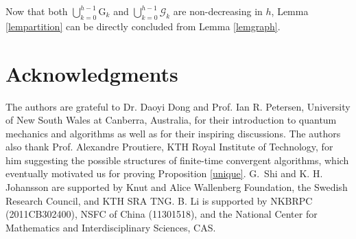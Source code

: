 \documentclass[a4paper, 11pt]{article}
\begin{document}
Now that  both $\bigcup_{k=0}^{h-1} \mathrm{G}_k$ and $\bigcup_{k=0}^{h-1} \mathcal{G}_k$ are non-decreasing in $h$, Lemma \ref{lempartition} can be directly concluded from Lemma \ref{lemgraph}.

\medskip

\section*{Acknowledgments}
The authors are grateful to Dr. Daoyi Dong and Prof. Ian R. Petersen, University of New South Wales at Canberra, Australia, for their introduction to quantum mechanics and algorithms as well as for their inspiring discussions. The authors also thank Prof. Alexandre Proutiere, KTH Royal Institute of Technology,  for him suggesting  the possible structures of finite-time convergent algorithms, which eventually motivated  us for proving Proposition \ref{unique}. G.~Shi and K. H. Johansson are supported by Knut and Alice Wallenberg Foundation, the Swedish Research
Council, and KTH SRA TNG. B. Li is supported  by  NKBRPC (2011CB302400),  NSFC of China (11301518), and  the National Center for Mathematics and Interdisciplinary Sciences, CAS.
\end{document}

